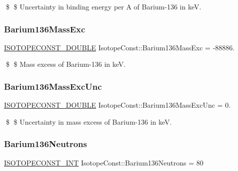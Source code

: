 \$ \$ Uncertainty in binding energy per A of Barium-\/136 in keV. \mbox{\label{group___isotope_const-_barium-_ba136_ga9a36b42ca0f06b1f9d0b03fad4aab920}} 
\subsubsection{\texorpdfstring{Barium136\+Mass\+Exc}{Barium136MassExc}}
{\footnotesize\ttfamily \mbox{\hyperlink{group___isotope_const-_macros_ga8f45a7272ce02c0b4c65c44636ed719a}{I\+S\+O\+T\+O\+P\+E\+C\+O\+N\+S\+T\+\_\+\+D\+O\+U\+B\+LE}} Isotope\+Const\+::\+Barium136\+Mass\+Exc = -\/88886.}

\$ \$ Mass excess of Barium-\/136 in keV. \mbox{\label{group___isotope_const-_barium-_ba136_ga9cbf975602e9d19ac1d09ecc6aa51777}} 
\subsubsection{\texorpdfstring{Barium136\+Mass\+Exc\+Unc}{Barium136MassExcUnc}}
{\footnotesize\ttfamily \mbox{\hyperlink{group___isotope_const-_macros_ga8f45a7272ce02c0b4c65c44636ed719a}{I\+S\+O\+T\+O\+P\+E\+C\+O\+N\+S\+T\+\_\+\+D\+O\+U\+B\+LE}} Isotope\+Const\+::\+Barium136\+Mass\+Exc\+Unc = 0.}

\$ \$ Uncertainty in mass excess of Barium-\/136 in keV. \mbox{\label{group___isotope_const-_barium-_ba136_ga207ac0f945f2a6e0a3abf848dd1a6a09}} 
\subsubsection{\texorpdfstring{Barium136\+Neutrons}{Barium136Neutrons}}
{\footnotesize\ttfamily \mbox{\hyperlink{group___isotope_const-_macros_ga5f18360b3e99483a35c32d789e62621c}{I\+S\+O\+T\+O\+P\+E\+C\+O\+N\+S\+T\+\_\+\+I\+NT}} Isotope\+Const\+::\+Barium136\+Neutrons = 80}


